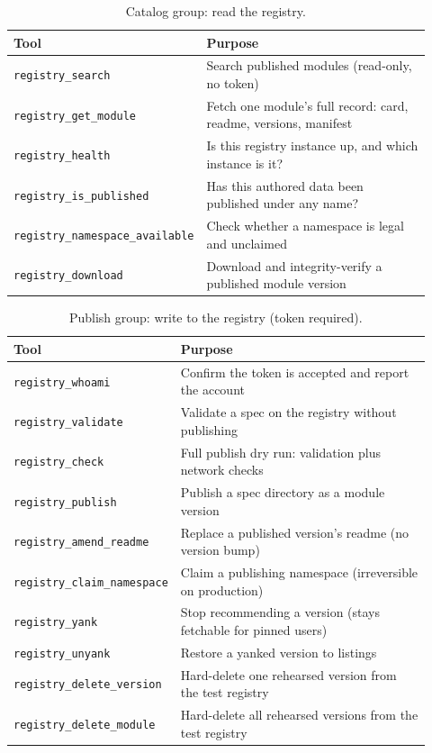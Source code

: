 \documentclass[11pt,a4paper]{article}
\begin{document}
\begin{table}[ht]
\centering
\scriptsize
\caption{Catalog group: read the registry.}
\label{tab:tools-catalog}
\begin{tabular}{@{}p{0.32\linewidth}p{0.60\linewidth}@{}}
\toprule
Tool & Purpose \\
\midrule
\texttt{registry\_search}              & Search published modules (read-only, no token) \\
\texttt{registry\_get\_module}          & Fetch one module's full record: card, readme, versions, manifest \\
\texttt{registry\_health}              & Is this registry instance up, and which instance is it? \\
\texttt{registry\_is\_published}        & Has this authored data been published under any name? \\
\texttt{registry\_namespace\_available} & Check whether a namespace is legal and unclaimed \\
\texttt{registry\_download}            & Download and integrity-verify a published module version \\
\bottomrule
\end{tabular}
\end{table}

\begin{table}[ht]
\centering
\scriptsize
\caption{Publish group: write to the registry (token required).}
\label{tab:tools-publish}
\begin{tabular}{@{}p{0.32\linewidth}p{0.60\linewidth}@{}}
\toprule
Tool & Purpose \\
\midrule
\texttt{registry\_whoami}           & Confirm the token is accepted and report the account \\
\texttt{registry\_validate}         & Validate a spec on the registry without publishing \\
\texttt{registry\_check}            & Full publish dry run: validation plus network checks \\
\texttt{registry\_publish}          & Publish a spec directory as a module version \\
\texttt{registry\_amend\_readme}    & Replace a published version's readme (no version bump) \\
\texttt{registry\_claim\_namespace} & Claim a publishing namespace (irreversible on production) \\
\texttt{registry\_yank}             & Stop recommending a version (stays fetchable for pinned users) \\
\texttt{registry\_unyank}           & Restore a yanked version to listings \\
\texttt{registry\_delete\_version}  & Hard-delete one rehearsed version from the test registry \\
\texttt{registry\_delete\_module}   & Hard-delete all rehearsed versions from the test registry \\
\bottomrule
\end{tabular}
\end{table}
\end{document}
